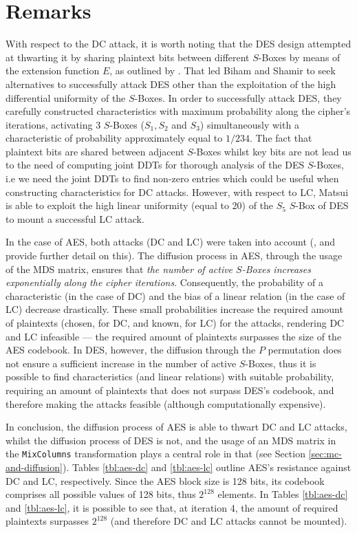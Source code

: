 \documentclass{report}
\begin{document}
\section{Remarks}
With respect to the DC attack, it is worth noting that the DES design attempted at thwarting it by sharing plaintext bits between different $S$-Boxes by means of the extension function $E$, as outlined by \cite{Coppersmith1994}. That led Biham and Shamir \cite{ShamirBook} to seek alternatives to successfully attack DES other than the exploitation of the high differential uniformity of the $S$-Boxes. In order to successfully attack DES, they carefully constructed characteristics with maximum probability along the cipher's iterations, activating $3$ $S$-Boxes ($S_1, S_2$ and $S_3$) simultaneously with a characteristic of probability approximately equal to $1/234$. The fact that plaintext bits are shared between adjacent $S$-Boxes whilst key bits are not lead us to the need of computing joint DDTs for thorough analysis of the DES $S$-Boxes, i.e we need the joint DDTs to find non-zero entries which could be useful when constructing characteristics for DC attacks. However, with respect to LC, Matsui \cite{Matsui1993LinearCM} is able to exploit the high linear uniformity (equal to 20) of the $S_5$ $S$-Box of DES to mount a successful LC attack.

In the case of AES, both attacks (DC and LC) were taken into account (\cite{Susan}, \cite{Rijndael} and \cite{WideTrail2001} provide further detail on this). The diffusion process in AES, through the usage of the MDS matrix, ensures that \emph{the number of active $S$-Boxes increases exponentially along the cipher iterations}. Consequently, the probability of a characteristic (in the case of DC) and the bias of a linear relation (in the case of LC) decrease drastically. These small probabilities increase the required amount of plaintexts (chosen, for DC, and known, for LC) for the attacks, rendering DC and LC infeasible --- the required amount of plaintexts surpasses the size of the AES codebook. In DES, however, the diffusion through the $P$ permutation does not ensure a sufficient increase in the number of active $S$-Boxes, thus it is possible to find characteristics (and linear relations) with suitable probability, requiring an amount of plaintexts that does not surpass DES's codebook, and therefore making the attacks feasible (although computationally expensive).

In conclusion, the diffusion process of AES is able to thwart DC and LC attacks, whilst the diffusion process of DES is not, and the usage of an MDS matrix in the \texttt{MixColumns} transformation plays a central role in that (see Section \ref{sec:mc-and-diffusion}). Tables \ref{tbl:aes-dc} and \ref{tbl:aes-lc} outline AES's resistance against DC and LC, respectively. Since the AES block size is 128 bits, its codebook comprises all possible values of 128 bits, thus $2^{128}$ elements. In Tables \ref{tbl:aes-dc} and \ref{tbl:aes-lc}, it is possible to see that, at iteration 4, the amount of required plaintexts surpasses $2^{128}$ (and therefore DC and LC attacks cannot be mounted).
\end{document}
